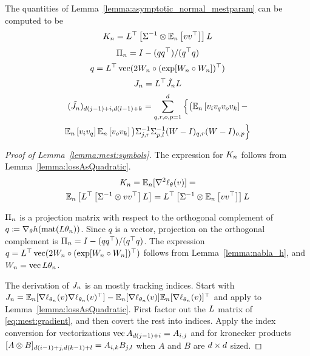 \begin{lemma}\label{lemma:mest:symbols}
The quantities of Lemma~\ref{lemma:asymptotic_normal_mestparam} can be computed to be
\[K_n = L^\top   \left[ \Sigma^{-1} \otimes \mathbb{E}_n \left[  v v^\top \right] \right]L\]
\[\Pi_n = I - (qq^\top)/(q^{\top}q)\] 
\[q = L^\top\operatorname*{vec}(2W_n \circ (\exp [ W_n\circ W_n ])^\top)\]
\[J_n = L^\top \tilde {J_n} L \]
\begin{multline}
     (\tilde {J_n} )_{d(j-1)+i,d(l-1)+k} =
    \sum_{q,r,o,p=1}^{d} \Big\{
    \big( \mathbb{E}_n\left[ v_i v_q v_o v_k \right]- \\
    \mathbb{E}_n\left[ v_i v_q \right]\mathbb{E}_n\left[ v_o v_k \right]\big)
    \Sigma^{-1}_{j,r}
    \Sigma^{-1}_{p,l}
    (W-I)_{q,r}
    (W-I)_{o,p}
    \Big\}
\end{multline}
\end{lemma}
\begin{proof}[Proof of Lemma~\ref{lemma:mest:symbols}]

The expression for $K_n$ follows from Lemma~\ref{lemma:lossAsQuadratic}.
\begin{multline}
K_n=
\mathbb{E}_n[\nabla^2 \ell_\theta(v)] = \\
\mathbb{E}_n \left[ L^\top \left[\Sigma^{-1} \otimes vv^\top\right]  L \right] 
=  L^\top \left[\Sigma^{-1} \otimes \mathbb{E}_n \left[ vv^\top\right] \right]  L 
\end{multline}

$\Pi_n$  is a projection matrix with respect to the orthogonal complement of $q\coloneqq \nabla_{\theta} h(\operatorname*{mat}(L\theta_n))$. Since $q$ is a vector, projection on the orthogonal complement is $\Pi_n = I - (qq^\top)/(q^{\top}q)$. The expression $q=L^\top\operatorname*{vec}(2W_n \circ (\exp [ W_n\circ W_n ])^\top)$ follows from Lemma~\ref{lemma:nabla_h}, and $W_n = \operatorname*{vec}{L\theta_n}$.

The derivation of $J_n$ is an mostly tracking indices. Start with $J_n = \mathbb{E}_n[\nabla \ell_{\theta_n}(v)\nabla \ell_{\theta_n}(v)^\top]
 -\mathbb{E}_n[\nabla \ell_{\theta_n}(v)]\mathbb{E}_n[\nabla \ell_{\theta_n}(v)]^\top$ and apply to  Lemma~\ref{lemma:lossAsQuadratic}. First factor out the $L$ matrix of \eqref{eq:mest:gradient}, and then covert the rest into indices. Apply the index conversion for vectorizations $\operatorname*{vec}{A}_{d(j-1)+i}=A_{i,j}$ and for kronecker products $[A\otimes{}B]_{d(i-1)+j,d(k-1)+l}=A_{i,k}B_{j,l}$ when $A$ and $B$ are $d\times d$ sized.
\end{proof}


